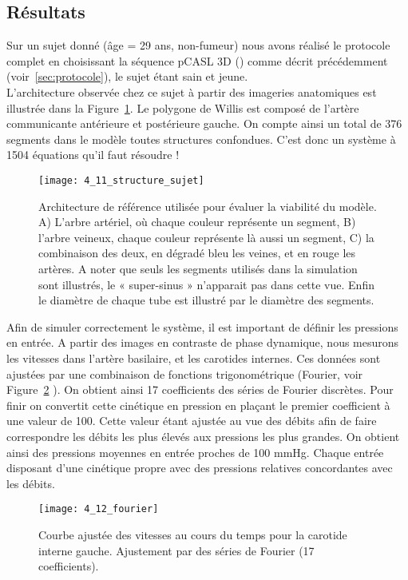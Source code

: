 \subsection{Résultats}
Sur un sujet donné (âge = 29 ans, non-fumeur) nous avons réalisé le protocole complet en
choisissant la séquence pCASL 3D (\cite{Wu2007}) comme décrit précédemment (voir~\ref{sec:protocole}), le sujet étant sain et
jeune.\\
L’architecture observée chez ce sujet à partir des imageries anatomiques est illustrée dans la
Figure~\ref{fig:4_11_structure_sujet}. Le polygone de Willis est composé de l’artère communicante antérieure et postérieure
gauche. On compte ainsi un total de 376 segments dans le modèle toutes structures confondues. C’est
donc un système à 1504 équations qu’il faut résoudre !
\begin{figure}[!t]
\centering
\texttt{[image: 4\_11\_structure\_sujet]}
\caption{Architecture de référence utilisée pour évaluer la viabilité du modèle. A) L'arbre artériel, où chaque couleur
représente un segment, B) l'arbre veineux, chaque couleur représente là aussi un segment, C) la combinaison des deux, en
dégradé bleu les veines, et en rouge les artères. A noter que seuls les segments utilisés dans la simulation sont illustrés, le
« super-sinus » n’apparait pas dans cette vue. Enfin le diamètre de chaque tube est illustré par le diamètre des segments.}
\label{fig:4_11_structure_sujet}	
\end{figure}
Afin de simuler correctement le système, il est important de définir les pressions en entrée. A
partir des images en contraste de phase dynamique, nous mesurons les vitesses dans l’artère basilaire,
et les carotides internes. Ces données sont ajustées par une combinaison de fonctions trigonométrique
(Fourier, voir Figure~\ref{fig:4_12_fourier}	). On obtient ainsi 17 coefficients des séries de Fourier discrètes. Pour finir on
convertit cette cinétique en pression en plaçant le premier coefficient à une valeur de 100. Cette valeur
étant ajustée au vue des débits afin de faire correspondre les débits les plus élevés aux pressions les
plus grandes. On obtient ainsi des pressions moyennes en entrée proches de 100 mmHg. Chaque
entrée disposant d’une cinétique propre avec des pressions relatives concordantes avec les débits.\\
\begin{figure}[!b]
\centering
\texttt{[image: 4\_12\_fourier]}
\caption{Courbe ajustée des vitesses au cours du temps pour la carotide interne gauche. Ajustement par des séries de
Fourier (17 coefficients).}
\label{fig:4_12_fourier}	
\end{figure}
